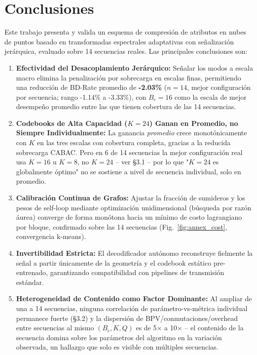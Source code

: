 \documentclass[11pt,a4paper]{article}
\begin{document}
\section{Conclusiones}
Este trabajo presenta y valida un esquema de compresión de atributos en nubes de puntos basado en transformadas espectrales adaptativas con señalización jerárquica, evaluado sobre 14 secuencias reales. Las principales conclusiones son:
\begin{enumerate}
  \item \textbf{Efectividad del Desacoplamiento Jerárquico:} Señalar los modos a escala macro elimina la penalización por sobrecarga en escalas finas, permitiendo una reducción de BD-Rate promedio de \textbf{-2.03\%} ($n=14$, mejor configuración por secuencia; rango -1.14\% a -3.33\%), con $B_c=16$ como la escala de mejor desempeño promedio entre las que tienen cobertura de las 14 secuencias.
  \item \textbf{Codebooks de Alta Capacidad ($K=24$) Ganan en Promedio, no Siempre Individualmente:} La ganancia \emph{promedio} crece monotónicamente con $K$ en las tres escalas con cobertura completa, gracias a la reducida sobrecarga CABAC. Pero en 6 de 14 secuencias la mejor configuración real usa $K=16$ u $K=8$, no $K=24$ -- ver \S3.1 -- por lo que "$K=24$ es globalmente óptimo" no se sostiene a nivel de secuencia individual, solo en promedio.
  \item \textbf{Calibración Continua de Grafos:} Ajustar la fracción de sumideros y los pesos de self-loop mediante optimización unidimensional (búsqueda por razón áurea) converge de forma monótona hacia un mínimo de costo lagrangiano por bloque, confirmado sobre las 14 secuencias (Fig.~\ref{fig:annex_cost}, convergencia k-means).
  \item \textbf{Invertibilidad Estricta:} El decodificador autónomo reconstruye fielmente la señal a partir únicamente de la geometría y el codebook estático pre-entrenado, garantizando compatibilidad con pipelines de transmisión estándar.
  \item \textbf{Heterogeneidad de Contenido como Factor Dominante:} Al ampliar de una a 14 secuencias, ninguna correlación de parámetro-vs-métrica individual permanece fuerte (\S3.2) y la dispersión de BPV/conmutaciones/overhead entre secuencias al mismo $(B_c,K,Q)$ es de 5$\times$ a 10$\times$ -- el contenido de la secuencia domina sobre los parámetros del algoritmo en la variación observada, un hallazgo que solo es visible con múltiples secuencias.
\end{enumerate}
\end{document}
